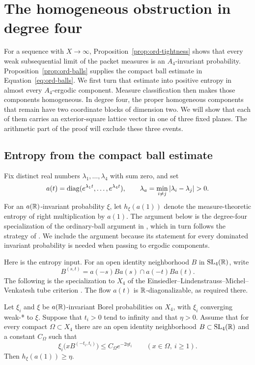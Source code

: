 \section{The homogeneous obstruction in degree four}\label{sec:rigidity}

For a sequence with \(X\to\infty\), Proposition~\ref{prop:ord-tightness}
shows that every weak subsequential limit of the packet measures is an
\(A_4\)-invariant probability.  Proposition~\ref{prop:ord-balls}
supplies the compact ball estimate in Equation~\eqref{eq:ord-balls}.
We first turn that estimate
into positive entropy in almost every \(A_4\)-ergodic component.
Measure classification then makes those components homogeneous.
In degree four, the proper homogeneous components that remain have two
coordinate blocks of dimension two.  We will show that each of them
carries an exterior-square lattice vector in one of three fixed planes.
The arithmetic part of the proof will exclude these three events.

\subsection{Entropy from the compact ball estimate}

Fix distinct real numbers \(\lambda_1,\ldots,\lambda_4\) with sum zero,
and set
\[
 a(t)=\diag(e^{\lambda_1t},\ldots,e^{\lambda_4t}),
 \qquad
 \lambda_a=\min_{i\ne j}|\lambda_i-\lambda_j|>0.
\]
For an \(a(\mathbb R)\)-invariant probability \(\xi\), let \(h_\xi(a(1))\)
denote the measure-theoretic entropy of right multiplication by \(a(1)\).
The argument below is the degree-four specialization of the
ordinary-ball argument in
\cite[Proposition~6.1 and Lemma~6.2]{PrimeDegreePackets}, which in turn
follows the strategy of \cite[Section~2.7.1]{ELMV2011}.
We include the argument because its statement for every dominated
invariant probability is needed when passing to ergodic components.

Here is the entropy input.  For an open identity neighborhood \(B\)
in \(\mathrm{SL}_4(\mathbb R)\), write
\[
 B^{(s,t)}=a(-s)Ba(s)\cap a(-t)Ba(t).
\]
The following is the specialization to \(X_4\) of the
Einsiedler--Lindenstrauss--Michel--Venkatesh tube criterion
\cite[Corollary~3.3 and Equation~(3.4)]{ELMV2009}.  The flow \(a(t)\)
is \(\mathbb R\)-diagonalizable, as required there.

\begin{theorem}
\label{thm:rig-tube-criterion}
Let \(\xi_i\) and \(\xi\) be \(a(\mathbb R)\)-invariant Borel probabilities
on \(X_4\), with \(\xi_i\) converging weak-* to \(\xi\).
Suppose that \(t_i>0\) tend to infinity and that \(\eta>0\).
Assume that for every compact \(\Omega\subset X_4\) there are an open
identity neighborhood \(B\subset\mathrm{SL}_4(\mathbb R)\) and a constant
\(C_\Omega\) such that
\[
 \xi_i\bigl(xB^{(-t_i,t_i)}\bigr)
 \le C_\Omega e^{-2\eta t_i}
 \qquad(x\in\Omega,\ i\ge1).
\]
Then \(h_\xi(a(1))\ge\eta\).
\end{theorem}

